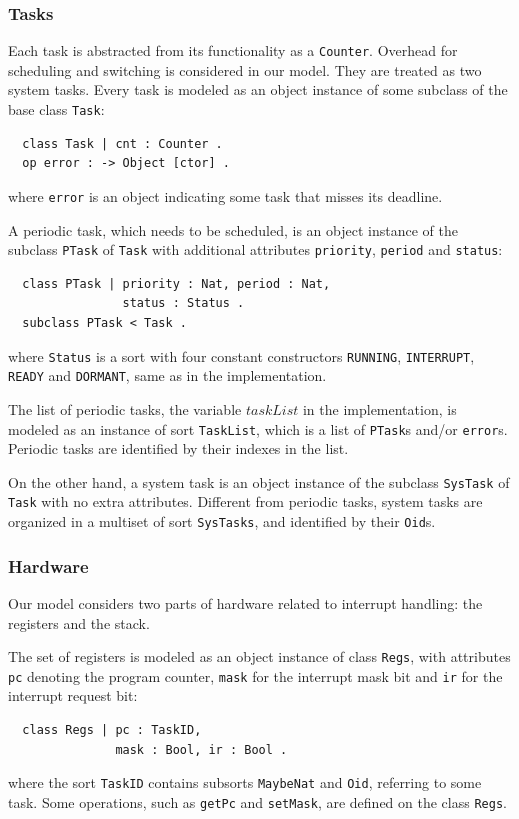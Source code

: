 \documentclass[journal]{IEEEtranTIE}
\begin{document}
\subsubsection{Tasks}
Each task is abstracted from its functionality as a \verb|Counter|.
Overhead for scheduling and switching is considered in our model. They
are treated as two system tasks. Every task is modeled as an object
instance of some subclass of the base class \verb|Task|:
\begin{verbatim}
  class Task | cnt : Counter .
  op error : -> Object [ctor] .
\end{verbatim}
where \verb|error| is an object indicating some task that misses its
deadline.

A periodic task, which needs to be scheduled, is an object instance of
the subclass \verb|PTask| of \verb|Task| with additional attributes
\verb|priority|, \verb|period| and \verb|status|:
\begin{verbatim}
  class PTask | priority : Nat, period : Nat, 
                status : Status .
  subclass PTask < Task .
\end{verbatim}
where \verb|Status| is a sort with four constant constructors
\verb|RUNNING|, \verb|INTERRUPT|, \verb|READY| and \verb|DORMANT|,
same as in the implementation.

The list of periodic tasks, the variable $\mathit{taskList}$ in the
implementation, is modeled as an instance of sort \verb|TaskList|,
which is a list of \verb|PTask|s and/or \verb|error|s.  Periodic tasks
are identified by their indexes in the list.

On the other hand, a system task is an object instance of the subclass
\verb|SysTask| of \verb|Task| with no extra attributes.  Different
from periodic tasks, system tasks are organized in a multiset of sort
\verb|SysTasks|, and identified by their \verb|Oid|s.

\subsubsection{Hardware}
Our model considers two parts of hardware related to interrupt
handling: the registers and the stack.

The set of registers is modeled as an object instance of class
\verb|Regs|, with attributes \verb|pc| denoting the program counter,
\verb|mask| for the interrupt mask bit and \verb|ir| for the interrupt
request bit:
\begin{verbatim}
  class Regs | pc : TaskID, 
               mask : Bool, ir : Bool .
\end{verbatim}
where the sort \verb|TaskID| contains subsorts \verb|MaybeNat| and
\verb|Oid|, referring to some task. Some operations, such as
\verb|getPc| and \verb|setMask|, are defined on the class \verb|Regs|.
\end{document}
